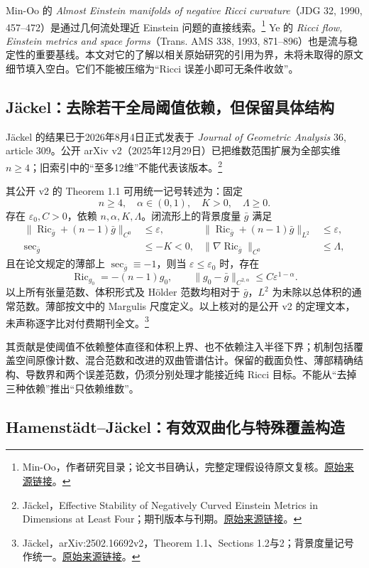 \documentclass[11pt,a4paper]{article}
\theoremstyle{definition}
\newcommand{\Ric}{\operatorname{Ric}}
\newcommand{\src}[3]{\footnote{\raggedright #1，#2。\href{#3}{原始来源链接}。}}
\begin{document}
Min-Oo 的 \emph{Almost Einstein manifolds of negative Ricci curvature}（JDG 32, 1990, 457--472）是通过几何流处理近 Einstein 问题的直接线索。\src{Min-Oo}{作者研究目录；论文书目确认，完整定理假设待原文复核}{https://math.mcmaster.ca/minoo/research.html}
Ye 的 \emph{Ricci flow, Einstein metrics and space forms}（Trans. AMS 338, 1993, 871--896）也是流与稳定性的重要基线。本文对它的了解以相关原始研究的引用为界，未将未取得的原文细节填入空白。它们不能被压缩为“Ricci 误差小即可无条件收敛”。

\subsection{Jäckel：去除若干全局阈值依赖，但保留具体结构}

Jäckel 的结果已于2026年8月4日正式发表于 \emph{Journal of Geometric Analysis} 36, article 309。公开 arXiv v2（2025年12月29日）已把维数范围扩展为全部实维 $n\ge4$；旧索引中的“至多12维”不能代表该版本。\src{Jäckel}{Effective Stability of Negatively Curved Einstein Metrics in Dimensions at Least Four；期刊版本与刊期}{https://link.springer.com/article/10.1007/s12220-026-02563-1}

其公开 v2 的 Theorem 1.1 可用统一记号转述为：固定
\[
n\ge4,\quad\alpha\in(0,1),\quad K>0,\quad\Lambda\ge0.
\]
存在 $\varepsilon_0,C>0$，依赖 $n,\alpha,K,\Lambda$。闭流形上的背景度量 $\bar g$ 满足
\begin{align*}
\|\Ric_{\bar g}+(n-1)\bar g\|_{C^0}&\le\varepsilon, &
\|\Ric_{\bar g}+(n-1)\bar g\|_{L^2}&\le\varepsilon,\\
\sec_{\bar g}&\le-K<0, &
\|\nabla\Ric_{\bar g}\|_{C^0}&\le\Lambda,
\end{align*}
且在论文规定的薄部上 $\sec_{\bar g}\equiv-1$，则当 $\varepsilon\le\varepsilon_0$ 时，存在
\[
\Ric_{g_0}=-(n-1)g_0,\qquad
\|g_0-\bar g\|_{C^{2,\alpha}}\le C\varepsilon^{1-\alpha}.
\]
以上所有张量范数、体积形式及 Hölder 范数均相对于 $\bar g$，$L^2$ 为未除以总体积的通常范数。薄部按文中的 Margulis 尺度定义。以上核对的是公开 v2 的定理文本，未声称逐字比对付费期刊全文。\src{Jäckel}{arXiv:2502.16692v2，Theorem 1.1、Sections 1.2与2；背景度量记号作统一}{https://arxiv.org/html/2502.16692v2}

其贡献是使阈值不依赖整体直径和体积上界、也不依赖注入半径下界；机制包括覆盖空间原像计数、混合范数和改进的双曲管谱估计。保留的截面负性、薄部精确结构、导数界和两个误差范数，仍须分别处理才能接近纯 Ricci 目标。不能从“去掉三种依赖”推出“只依赖维数”。

\subsection{Hamenstädt--Jäckel：有效双曲化与特殊覆盖构造}
\end{document}

